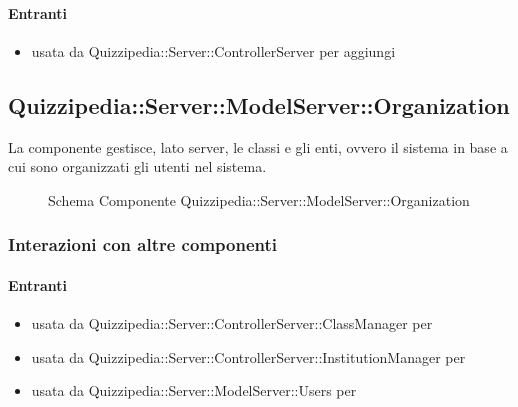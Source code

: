 \paragraph{Entranti}
\begin{itemize}
\item usata da Quizzipedia::Server::ControllerServer per aggiungi
\end{itemize}
\subsection{Quizzipedia::Server::ModelServer::Organization}
La componente gestisce, lato server, le classi e gli enti, ovvero il sistema in base a cui sono organizzati gli utenti nel sistema.
\begin{figure}[H]
\centering
\noindent{}
\caption[Schema Componente Quizzipedia::Server::ModelServer::Organization]{Schema Componente Quizzipedia::Server::ModelServer::Organization}
\end{figure}
\subsubsection{Interazioni con altre componenti}
\paragraph{Entranti}
\begin{itemize}
\item usata da Quizzipedia::Server::ControllerServer::ClassManager per 
\item usata da Quizzipedia::Server::ControllerServer::InstitutionManager per 
\item usata da Quizzipedia::Server::ModelServer::Users per 
\end{itemize}
